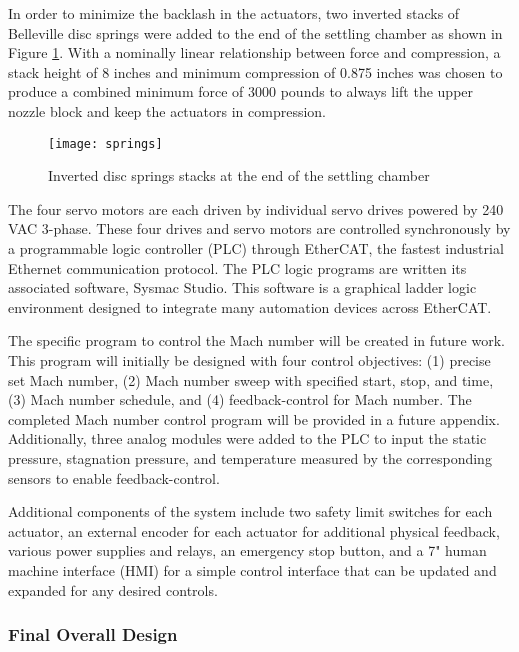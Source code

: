 In order to minimize the backlash in the actuators, two inverted stacks of Belleville disc springs were added to the end of the settling chamber as shown in Figure \ref{fig:springs}. With a nominally linear relationship between force and compression, a stack height of 8 inches and minimum compression of 0.875 inches was chosen to produce a combined minimum force of 3000 pounds to always lift the upper nozzle block and keep the actuators in compression.

\begin{figure}[ht!]
    \centering
    \texttt{[image: springs]}
    \caption{Inverted disc springs stacks at the end of the settling chamber}
    \label{fig:springs}
\end{figure}

The four servo motors are each driven by individual servo drives powered by 240 VAC 3-phase. These four drives and servo motors are controlled synchronously by a programmable logic controller (PLC) through EtherCAT, the fastest industrial Ethernet communication protocol. The PLC logic programs are written its associated software, Sysmac Studio. This software is a graphical ladder logic environment designed to integrate many automation devices across EtherCAT.

The specific program to control the Mach number will be created in future work. This program will initially be designed with four control objectives: (1) precise set Mach number, (2) Mach number sweep with specified start, stop, and time, (3) Mach number schedule, and (4) feedback-control for Mach number. The completed Mach number control program will be provided in a future appendix.
Additionally, three analog modules were added to the PLC to input the static pressure, stagnation pressure, and temperature measured by the corresponding sensors to enable feedback-control. 

Additional components of the system include two safety limit switches for each actuator, an external encoder for each actuator for additional physical feedback, various power supplies and relays, an emergency stop button, and a 7" human machine interface (HMI) for a simple control interface that can be updated and expanded for any desired controls.

\subsubsection*{Final Overall Design}

